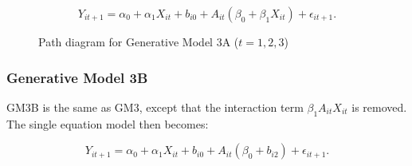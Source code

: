 \documentclass[
  12pt,
  a4paper,
]{article}
\begin{document}
\[
Y_{it+1} = \alpha_0 + \alpha_1 X_{it} + b_{i0} + A_{it} (\beta_0 + \beta_1 X_{it}) + \epsilon_{it+1}.
\]

\begin{figure}[H]

\caption{\label{fig-GM3A_path}Path diagram for Generative Model 3A
(\(t = 1, 2, 3\))}


\end{figure}%

\subsubsection{Generative Model 3B}\label{generative-model-3b}

GM3B is the same as GM3, except that the interaction term
\(\beta_1 A_{it} X_{it}\) is removed. The single equation model then
becomes:

\[
Y_{it+1} = \alpha_0 + \alpha_1 X_{it} + b_{i0} + A_{it} (\beta_0 + b_{i2}) + \epsilon_{it+1}.
\]
\end{document}
